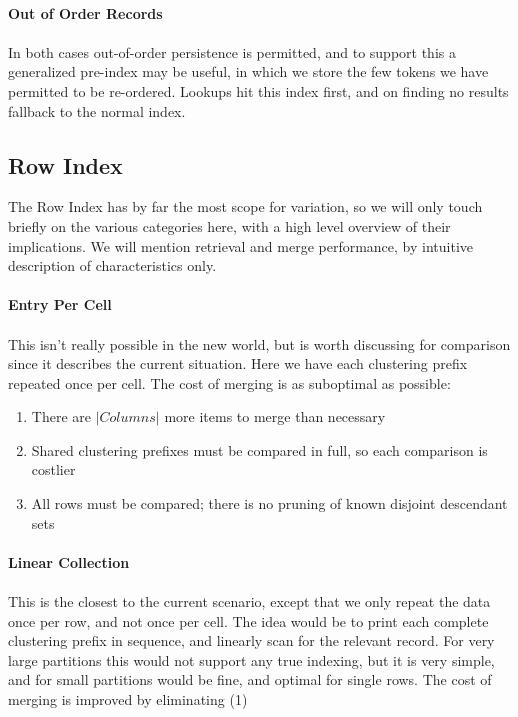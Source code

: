 \documentclass[fleqn]{article}
\begin{document}
\small
\paragraph{Out of Order Records}
\paragraph{}
    In both cases out-of-order persistence is permitted, and to support this a generalized pre-index
    may be useful, in which we store the few tokens we have permitted to be re-ordered. Lookups hit
    this index first, and on finding no results fallback to the normal index.

\subsection{Row Index}
The Row Index has by far the most scope for variation, so we will only touch briefly on the various
categories here, with a high level overview of their implications. We will mention retrieval and
merge performance, by intuitive description of characteristics only.
\paragraph{Entry Per Cell}
\paragraph{}
    This isn't really possible in the new world, but is worth discussing for comparison since it
    describes the current situation. Here we have each clustering prefix repeated once per cell.
    The cost of merging is as suboptimal as possible: 
    \begin{enumerate}
      \item There are $\lvert Columns \rvert$ more items to merge than necessary
      \item Shared clustering prefixes must be compared in full, so each comparison is costlier
      \item All rows must be compared; there is no pruning of known disjoint descendant sets 
    \end{enumerate}
\paragraph{Linear Collection}
\paragraph{}
    This is the closest to the current scenario, except that we only repeat the data once per row,
    and not once per cell. The idea would be to print each complete clustering prefix in sequence,
    and linearly scan for the relevant record. For very large partitions this would not support 
    any true indexing, but it is very simple, and for small partitions would be fine, and optimal
    for single rows. The cost of merging is improved by eliminating (1)
\end{document}
